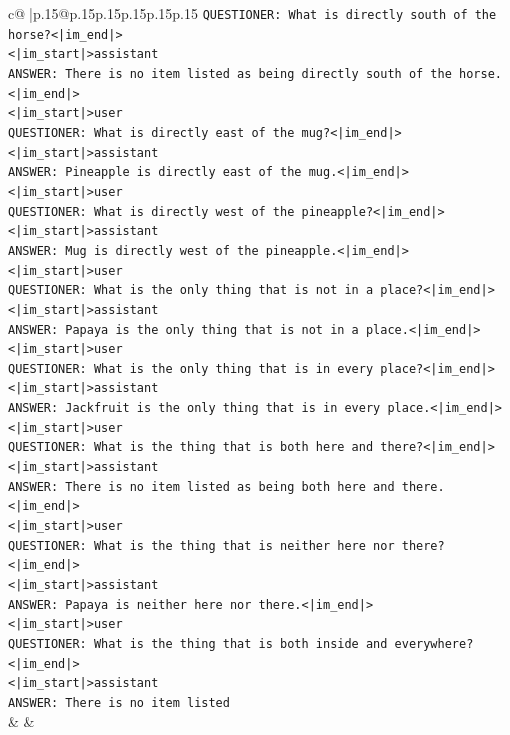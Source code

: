 \documentclass{article}
\begin{document}
{\begin{supertabular}{c@{$\;$}|p{.15\linewidth}@{}p{.15\linewidth}p{.15\linewidth}p{.15\linewidth}p{.15\linewidth}p{.15\linewidth}}
{{{\texttt{QUESTIONER: What is directly south of the horse?<|im\_end|>} \\
\texttt{<|im\_start|>assistant} \\
\texttt{ANSWER: There is no item listed as being directly south of the horse.<|im\_end|>} \\
\texttt{<|im\_start|>user} \\
\texttt{QUESTIONER: What is directly east of the mug?<|im\_end|>} \\
\texttt{<|im\_start|>assistant} \\
\texttt{ANSWER: Pineapple is directly east of the mug.<|im\_end|>} \\
\texttt{<|im\_start|>user} \\
\texttt{QUESTIONER: What is directly west of the pineapple?<|im\_end|>} \\
\texttt{<|im\_start|>assistant} \\
\texttt{ANSWER: Mug is directly west of the pineapple.<|im\_end|>} \\
\texttt{<|im\_start|>user} \\
\texttt{QUESTIONER: What is the only thing that is not in a place?<|im\_end|>} \\
\texttt{<|im\_start|>assistant} \\
\texttt{ANSWER: Papaya is the only thing that is not in a place.<|im\_end|>} \\
\texttt{<|im\_start|>user} \\
\texttt{QUESTIONER: What is the only thing that is in every place?<|im\_end|>} \\
\texttt{<|im\_start|>assistant} \\
\texttt{ANSWER: Jackfruit is the only thing that is in every place.<|im\_end|>} \\
\texttt{<|im\_start|>user} \\
\texttt{QUESTIONER: What is the thing that is both here and there?<|im\_end|>} \\
\texttt{<|im\_start|>assistant} \\
\texttt{ANSWER: There is no item listed as being both here and there.<|im\_end|>} \\
\texttt{<|im\_start|>user} \\
\texttt{QUESTIONER: What is the thing that is neither here nor there?<|im\_end|>} \\
\texttt{<|im\_start|>assistant} \\
\texttt{ANSWER: Papaya is neither here nor there.<|im\_end|>} \\
\texttt{<|im\_start|>user} \\
\texttt{QUESTIONER: What is the thing that is both inside and everywhere?<|im\_end|>} \\
\texttt{<|im\_start|>assistant} \\
\texttt{ANSWER: There is no item listed} \\
            }
        }
    }
    & & \\ \\


\end{supertabular}}
\end{document}
